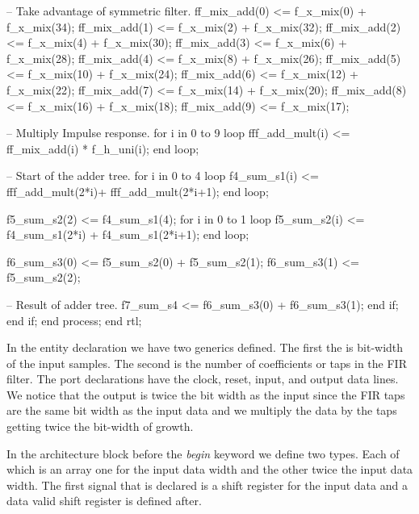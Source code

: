 \begin{VHDLlisting}[tabsize=2]
                -- Take advantage of symmetric filter. 
                ff_mix_add(0) <= f_x_mix(0) + f_x_mix(34);
                ff_mix_add(1) <= f_x_mix(2) + f_x_mix(32);
                ff_mix_add(2) <= f_x_mix(4) + f_x_mix(30);
                ff_mix_add(3) <= f_x_mix(6) + f_x_mix(28);
                ff_mix_add(4) <= f_x_mix(8) + f_x_mix(26);
                ff_mix_add(5) <= f_x_mix(10) + f_x_mix(24);
                ff_mix_add(6) <= f_x_mix(12) + f_x_mix(22);
                ff_mix_add(7) <= f_x_mix(14) + f_x_mix(20);
                ff_mix_add(8) <= f_x_mix(16) + f_x_mix(18);
                ff_mix_add(9) <= f_x_mix(17);
				
                -- Multiply Impulse response. 
                for i in 0 to 9 loop
                    fff_add_mult(i) <= ff_mix_add(i) * f_h_uni(i);
                end loop;				
				
                -- Start of the adder tree.
                for i in 0 to 4 loop
                    f4_sum_s1(i) <= fff_add_mult(2*i)+
                                    fff_add_mult(2*i+1);
                end loop;
				
                f5_sum_s2(2) <= f4_sum_s1(4);
                for i in 0 to 1 loop
                    f5_sum_s2(i) <= f4_sum_s1(2*i) + 
                                    f4_sum_s1(2*i+1);
                end loop;
				
                f6_sum_s3(0) <= f5_sum_s2(0) + f5_sum_s2(1);
                f6_sum_s3(1) <= f5_sum_s2(2);
								
                -- Result of adder tree.
                f7_sum_s4 <= f6_sum_s3(0) + f6_sum_s3(1);
            end if;			
        end if;
    end process;
end rtl;
\end{VHDLlisting}
	
In the entity declaration we have two generics defined. The first the is bit-width of the input samples. The second is the number of coefficients or taps in the \ac{FIR} filter. The port declarations have the clock, reset, input, and output data lines. We notice that the output is twice the bit width as the input since the \ac{FIR} taps are the same bit width as the input data and we multiply the data by the taps getting twice the bit-width of growth. 

In the architecture block before the \emph{begin} keyword we define two types. Each of which is an array one for the input data width and the other twice the input data width. The first signal that is declared is a shift register for the input data and a data valid shift register is defined after. 

